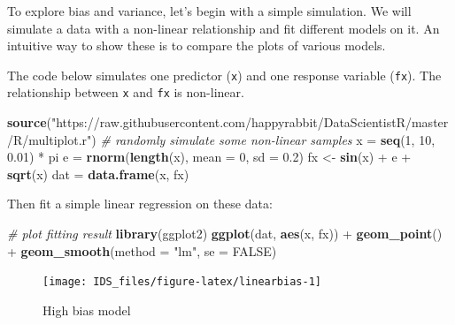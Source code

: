 \documentclass[12pt,]{krantz}
\newenvironment{Shaded}{\begin{snugshade}}{\end{snugshade}}
\newcommand{\KeywordTok}[1]{\textcolor[rgb]{0.13,0.29,0.53}{\textbf{{#1}}}}
\newcommand{\DataTypeTok}[1]{\textcolor[rgb]{0.13,0.29,0.53}{{#1}}}
\newcommand{\DecValTok}[1]{\textcolor[rgb]{0.00,0.00,0.81}{{#1}}}
\newcommand{\FloatTok}[1]{\textcolor[rgb]{0.00,0.00,0.81}{{#1}}}
\newcommand{\StringTok}[1]{\textcolor[rgb]{0.31,0.60,0.02}{{#1}}}
\newcommand{\CommentTok}[1]{\textcolor[rgb]{0.56,0.35,0.01}{\textit{{#1}}}}
\newcommand{\OtherTok}[1]{\textcolor[rgb]{0.56,0.35,0.01}{{#1}}}
\newcommand{\NormalTok}[1]{{#1}}
\theoremstyle{definition}
\theoremstyle{definition}
\theoremstyle{remark}
\begin{document}
To explore bias and variance, let's begin with a simple simulation. We
will simulate a data with a non-linear relationship and fit different
models on it. An intuitive way to show these is to compare the plots of
various models.

The code below simulates one predictor (\texttt{x}) and one response
variable (\texttt{fx}). The relationship between \texttt{x} and
\texttt{fx} is non-linear.

\begin{Shaded}
\begin{Highlighting}[]
\KeywordTok{source}\NormalTok{(}\StringTok{"https://raw.githubusercontent.com/happyrabbit/DataScientistR/master/R/multiplot.r"}\NormalTok{)}
\CommentTok{# randomly simulate some non-linear samples}
\NormalTok{x =}\StringTok{ }\KeywordTok{seq}\NormalTok{(}\DecValTok{1}\NormalTok{, }\DecValTok{10}\NormalTok{, }\FloatTok{0.01}\NormalTok{) *}\StringTok{ }\NormalTok{pi}
\NormalTok{e =}\StringTok{ }\KeywordTok{rnorm}\NormalTok{(}\KeywordTok{length}\NormalTok{(x), }\DataTypeTok{mean =} \DecValTok{0}\NormalTok{, }\DataTypeTok{sd =} \FloatTok{0.2}\NormalTok{)}
\NormalTok{fx <-}\StringTok{ }\KeywordTok{sin}\NormalTok{(x) +}\StringTok{ }\NormalTok{e +}\StringTok{ }\KeywordTok{sqrt}\NormalTok{(x)}
\NormalTok{dat =}\StringTok{ }\KeywordTok{data.frame}\NormalTok{(x, fx)}
\end{Highlighting}
\end{Shaded}

Then fit a simple linear regression on these data:

\begin{Shaded}
\begin{Highlighting}[]
\CommentTok{# plot fitting result}
\KeywordTok{library}\NormalTok{(ggplot2)}
\KeywordTok{ggplot}\NormalTok{(dat, }\KeywordTok{aes}\NormalTok{(x, fx)) +}\StringTok{ }\KeywordTok{geom_point}\NormalTok{() +}\StringTok{ }\KeywordTok{geom_smooth}\NormalTok{(}\DataTypeTok{method =} \StringTok{"lm"}\NormalTok{, }\DataTypeTok{se =} \OtherTok{FALSE}\NormalTok{)}
\end{Highlighting}
\end{Shaded}

\begin{figure}

{\centering \texttt{[image: IDS\_files/figure-latex/linearbias-1]} 

}

\caption{High bias model}\label{fig:linearbias}
\end{figure}
\end{document}
